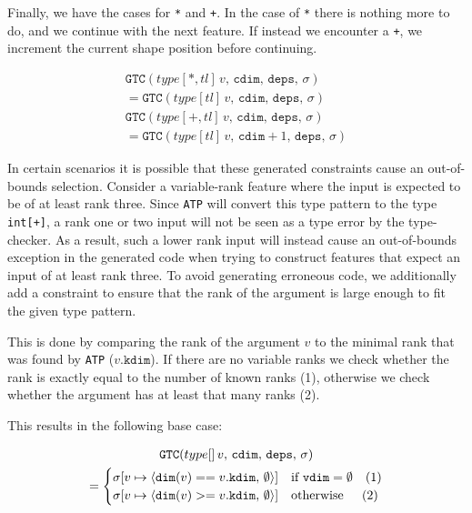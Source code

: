 \documentclass[sigconf,screen]{acmart}
\newcommand{\tpplus}{\texttt{+}}
\newcommand{\tpstar}{\texttt{*}}
\newcommand{\rest}{\ensuremath{tl}}
\newcommand{\fdim}{\texttt{kdim}}
\newcommand{\vdim}{\texttt{vdim}}
\newcommand{\gtc}[4]{\ensuremath{\texttt{GTC}(#1\,v,\,#2,\,#3,\,#4)}}
\newcommand{\cdim}{\texttt{cdim}}
\newcommand{\deps}{\texttt{deps}}
\newcommand{\cenv}{\ensuremath{\sigma{}}}
\newcommand{\envmap}[3]{\ensuremath{[#1\mapsto\langle{}#3,\,#2\rangle{}]}}
\begin{document}
Finally, we have the cases for \tpstar{} and \tpplus{}.
In the case of \tpstar{} there is nothing more to do, and we continue with the next feature.
If instead we encounter a \tpplus{}, we increment the current shape position before continuing.

\begin{gather*}
  \gtc{type[\tpstar,\rest]}{\cdim}{\deps}{\cenv} \\
    = \gtc{type[\rest]}{\cdim}{\deps}{\cenv}
  \\[2pt]
  \gtc{type[\tpplus,\rest]}{\cdim}{\deps}{\cenv} \\
    = \gtc{type[\rest]}{\cdim+1}{\deps}{\cenv}
\end{gather*}

In certain scenarios it is possible that these generated constraints cause an out-of-bounds selection.
Consider a variable-rank feature where the input is expected to be of at least rank three.
Since \texttt{ATP} will convert this type pattern to the type \texttt{int[+]}, a rank one or two input will not be seen as a type error by the type-checker.
As a result, such a lower rank input will instead cause an out-of-bounds exception in the generated code when trying to construct features that expect an input of at least rank three.
To avoid generating erroneous code, we additionally add a constraint to ensure that the rank of the argument is large enough to fit the given type pattern.

This is done by comparing the rank of the argument $v$ to the minimal rank that was found by \texttt{ATP} ($v.\fdim$).
If there are no variable ranks we check whether the rank is exactly equal to the number of known ranks (1), otherwise we check whether the argument has at least that many ranks (2).

This results in the following base case:

\begin{gather*}
  \gtc{type[]}{\cdim}{\deps}{\cenv} \\
    = \begin{cases}
      \cenv\envmap{v}{\emptyset}{\texttt{dim}(v) == v.\fdim}
        &\text{if } \vdim = \emptyset \hspace{10pt}(1) \\
      \cenv\envmap{v}{\emptyset}{\texttt{dim}(v) >= v.\fdim}
        &\text{otherwise} \hspace{14.5pt}(2)
    \end{cases}
\end{gather*}
\end{document}
